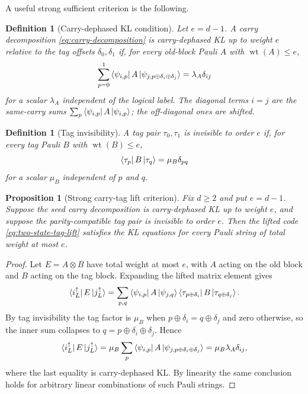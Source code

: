 \documentclass[11pt]{article}
\newcommand{\wt}{\operatorname{wt}}
\newtheorem{proposition}[theorem]{Proposition}
\newtheorem{definition}[theorem]{Definition}
\begin{document}
A useful strong sufficient criterion is the following.

\begin{definition}[Carry-dephased KL condition]
\label{def:carry-dephased-kl}
Let $e=d-1$.  A carry decomposition \eqref{eq:carry-decomposition} is carry-dephased KL up to
weight $e$ relative to the tag offsets $\delta_0,\delta_1$ if, for every old-block Pauli $A$
with $\wt(A)\le e$,
\begin{equation}
  \sum_{p=0}^1 \bra{\psi_{i,p}}A\ket{\psi_{j,p\oplus\delta_i\oplus\delta_j}}=\lambda_A\delta_{ij}
  \label{eq:carry-dephased-kl}
\end{equation}
for a scalar $\lambda_A$ independent of the logical label.  The diagonal terms $i=j$ are the
same-carry sums $\sum_p\bra{\psi_{i,p}}A\ket{\psi_{i,p}}$; the off-diagonal ones are shifted.
\end{definition}

\begin{definition}[Tag invisibility]
\label{def:tag-invisibility}
A tag pair $\tau_0,\tau_1$ is invisible to order $e$ if, for every tag Pauli $B$ with
$\wt(B)\le e$,
\begin{equation}
  \bra{\tau_p}B\ket{\tau_q}=\mu_B\delta_{pq}
  \label{eq:tag-invisibility}
\end{equation}
for a scalar $\mu_B$ independent of $p$ and $q$.
\end{definition}

\begin{proposition}[Strong carry-tag lift criterion]
\label{prop:strong-carry-tag}
Fix $d\ge2$ and put $e=d-1$.  Suppose the seed carry decomposition is carry-dephased KL up to
weight $e$, and suppose the parity-compatible tag pair is invisible to order $e$.  Then the lifted
code \eqref{eq:two-state-tag-lift} satisfies the KL equations for every Pauli string of total
weight at most $e$.
\end{proposition}

\begin{proof}
Let $E=A\otimes B$ have total weight at most $e$, with $A$ acting on the old block and $B$ acting
on the tag block.  Expanding the lifted matrix element gives
\[
  \bra{i_L^{\uparrow}}E\ket{j_L^{\uparrow}}
  =\sum_{p,q}\bra{\psi_{i,p}}A\ket{\psi_{j,q}}
  \bra{\tau_{p\oplus\delta_i}}B\ket{\tau_{q\oplus\delta_j}}.
\]
By tag invisibility the tag factor is $\mu_B$ when $p\oplus\delta_i=q\oplus\delta_j$ and zero
otherwise, so the inner sum collapses to $q=p\oplus\delta_i\oplus\delta_j$.  Hence
\[
  \bra{i_L^{\uparrow}}E\ket{j_L^{\uparrow}}
  =\mu_B\sum_p \bra{\psi_{i,p}}A\ket{\psi_{j,p\oplus\delta_i\oplus\delta_j}}
  =\mu_B\lambda_A\delta_{ij},
\]
where the last equality is carry-dephased KL.  By linearity the same conclusion holds for
arbitrary linear combinations of such Pauli strings.
\end{proof}
\end{document}
